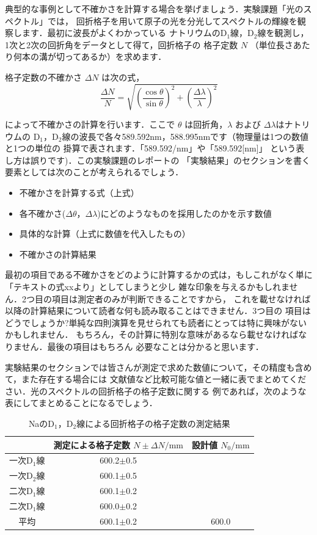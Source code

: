 \documentclass[a4paper,10pt]{jarticle}
\def\rm#1{\mathrm{#1}}
\begin{document}
典型的な事例として不確かさを計算する場合を挙げましょう．実験課題「光のスペクトル」では，
回折格子を用いて原子の光を分光してスペクトルの輝線を観察します．最初に波長がよくわかっている
ナトリウムのD$_1$線，D$_2$線を観測し，1次と2次の回折角をデータとして得て，回折格子の
格子定数 $N$ （単位長さあたり何本の溝が切ってあるか）を求めます．

格子定数の不確かさ $\Delta N$ は次の式，
%
\[
\frac{\Delta N}{N}=\sqrt{\left (\frac{\cos\theta}{\sin\theta}\right )^2+\left (\frac{\Delta \lambda}{\lambda}\right )^2}
\]

\noindent
によって不確かさの計算を行います．ここで $\theta$ は回折角，$\lambda$ および $\Delta \lambda$はナトリウムの
D$_1$，D$_2$線の波長で各々589.592nm，588.995nmです（物理量は1つの数値と1つの単位の
掛算で表されます．「589.592/nm」や「589.592[nm]」 という表し方は誤りです)．この実験課題のレポートの
「実験結果」のセクションを書く要素としては次のことが考えられるでしょう．
\begin{itemize}
\setlength{\itemsep}{-3mm}
 \item 不確かさを計算する式（上式）
 \item 各不確かさ($\Delta\theta$，$\Delta\lambda$)にどのようなものを採用したのかを示す数値
 \item 具体的な計算（上式に数値を代入したもの）
 \item 不確かさの計算結果
\end{itemize}

最初の項目である不確かさをどのように計算するかの式は，もしこれがなく単に「テキストの式xxより」としてしまうと少し
雑な印象を与えるかもしれません．2つ目の項目は測定者のみが判断できることですから，
これを載せなければ以降の計算結果について読者な何も読み取ることはできません．3つ目の
項目はどうでしょうか?単純な四則演算を見せられても読者にとっては特に興味がないかもしれません．
もちろん，その計算に特別な意味があるなら載せなければなりません．最後の項目はもちろん
必要なことは分かると思います．

実験結果のセクションでは皆さんが測定で求めた数値について，その精度も含めて，また存在する場合には
文献値など比較可能な値と一緒に表でまとめてください．光のスペクトルの回折格子の格子定数に関する
例であれば，次のような表にしてまとめることになるでしょう．
%
\begin{table}[ht]
\begin{center}
\caption{NaのD$_1$，D$_2$線による回折格子の格子定数の測定結果}
\label{tab2}
\begin{tabular}{ccc}\hline
 &測定による格子定数 $N\pm \Delta N / \rm{mm}$ & 設計値 $N_0 / \rm{mm}$ \\ \hline
 一次D$_1$線 & 600.2$\pm$0.5 & \\
 一次D$_2$線 & 600.1$\pm$0.5 & \\
二次D$_1$線 & 600.1$\pm$0.2 & \\
二次D$_1$線 & 600.0$\pm$0.2 & \\ \hline
平均 & 600.1$\pm$0.2 & 600.0 \\ \hline
\end{tabular}
\end{center}
\end{table}
\end{document}
